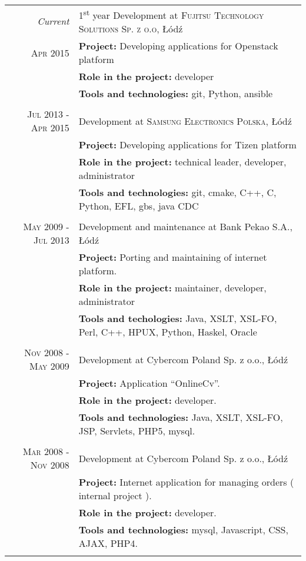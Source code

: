 \documentclass[a4paper,9pt]{article} %
\begin{document}
\begin{longtable}{r|p{11cm}}
\emph{Current} & 1\textsuperscript{st} year Development at \textsc{Fujitsu Technology Solutions Sp. z o.o}, Łódź \\
\textsc{Apr 2015} & \textbf{Project:} Developing applications for Openstack platform\\
& \textbf{Role in the project:} developer\\
& \textbf{Tools and technologies:} git, Python, ansible\\
\multicolumn{2}{c}{} \\

\textsc{Jul 2013 - Apr 2015} & Development at \textsc{Samsung Electronics Polska}, Łódź \\
& \textbf{Project:} Developing applications for Tizen platform\\
& \textbf{Role in the project:} technical leader, developer, administrator\\
& \textbf{Tools and technologies:} git, cmake, C++, C, Python, EFL, gbs, java CDC\\
\multicolumn{2}{c}{} \\

\textsc{May 2009 - Jul 2013} & Development and maintenance at Bank Pekao S.A., Łódź\\
& \textbf{Project:} Porting and maintaining of internet platform.\\
& \textbf{Role in the project:} maintainer, developer, administrator\\
& \textbf{Tools and techologies:} Java, XSLT, XSL-FO, Perl, C++, HPUX, Python, Haskel, Oracle\\
\multicolumn{2}{c}{} \\

\textsc{Nov 2008 - May 2009} & Development at Cybercom Poland Sp. z o.o., Łódź\\
& \textbf{Project:} Application “OnlineCv”.\\
& \textbf{Role in the project:} developer.\\
& \textbf{Tools and technologies:} Java, XSLT, XSL-FO, JSP, Servlets, PHP5, mysql.\\
\multicolumn{2}{c}{} \\

\textsc{Mar 2008 - Nov 2008} & Development at Cybercom Poland Sp. z o.o., Łódź\\
& \textbf{Project:} Internet application for managing orders ( internal project ).\\
& \textbf{Role in the project:} developer.\\
& \textbf{Tools and technologies:} mysql, Javascript, CSS, AJAX, PHP4.\\
\multicolumn{2}{c}{} \\


\end{longtable}
\end{document}
